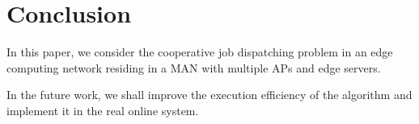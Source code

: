 \section{Conclusion}
\label{sec:conclusion}
In this paper, we consider the cooperative job dispatching problem in an edge computing network residing in a MAN with multiple APs and edge servers.

In the future work, we shall improve the execution efficiency of the algorithm and implement it in the real online system. 